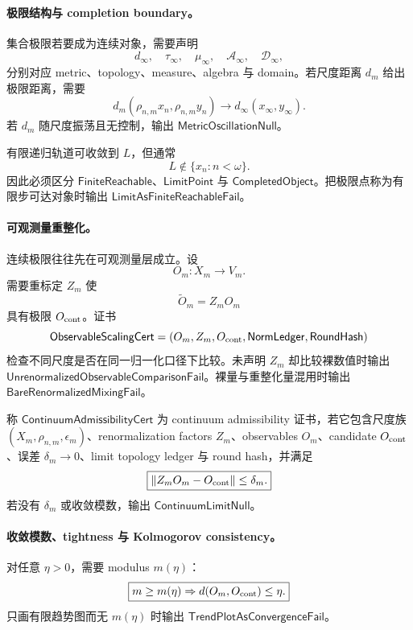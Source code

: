 \paragraph{极限结构与 completion boundary。}
集合极限若要成为连续对象，需要声明
\[
d_\infty,\quad
\tau_\infty,\quad
\mu_\infty,\quad
\mathcal A_\infty,\quad
\mathcal D_\infty,
\]
分别对应 metric、topology、measure、algebra 与 domain。若尺度距离 \(d_m\) 给出极限距离，需要
\[
d_m(\rho_{n,m}x_n,\rho_{n,m}y_n)
\to
d_\infty(x_\infty,y_\infty).
\]
若 \(d_m\) 随尺度振荡且无控制，输出 \(\mathsf{MetricOscillationNull}\)。

有限递归轨道可收敛到 \(L\)，但通常
\[
\boxed{
L\notin\{x_n:n<\omega\}.
}
\]
因此必须区分 \(\mathsf{FiniteReachable}\)、\(\mathsf{LimitPoint}\) 与 \(\mathsf{CompletedObject}\)。把极限点称为有限步可达对象时输出 \(\mathsf{LimitAsFiniteReachableFail}\)。

\paragraph{可观测量重整化。}
连续极限往往先在可观测量层成立。设
\[
O_m:X_m\to V_m.
\]
需要重标定 \(Z_m\) 使
\[
\boxed{
\widetilde O_m=Z_mO_m
}
\]
具有极限 \(O_{\rm cont}\)。证书
\[
\mathsf{ObservableScalingCert}
=(O_m,Z_m,O_{\rm cont},\mathsf{NormLedger},\mathsf{RoundHash})
\]
检查不同尺度是否在同一归一化口径下比较。未声明 \(Z_m\) 却比较裸数值时输出 \(\mathsf{UnrenormalizedObservableComparisonFail}\)。裸量与重整化量混用时输出 \(\mathsf{BareRenormalizedMixingFail}\)。

\begin{definition}\label{def:typed-address-biaxial-completion-continuum-admissibility-cert}
称 \(\mathsf{ContinuumAdmissibilityCert}\) 为 continuum admissibility 证书，若它包含尺度族 \((X_m,\rho_{n,m},\epsilon_m)\)、renormalization factors \(Z_m\)、observables \(O_m\)、candidate \(O_{\rm cont}\)、误差 \(\delta_m\to0\)、limit topology ledger 与 round hash，并满足
\[
\boxed{
\|Z_mO_m-O_{\rm cont}\|\le\delta_m.
}
\]
若没有 \(\delta_m\) 或收敛模数，输出 \(\mathsf{ContinuumLimitNull}\)。
\end{definition}

\paragraph{收敛模数、tightness 与 Kolmogorov consistency。}
对任意 \(\eta>0\)，需要 modulus \(m(\eta)\)：
\[
\boxed{
m\ge m(\eta)
\Rightarrow
d(O_m,O_{\rm cont})\le\eta.
}
\]
只画有限趋势图而无 \(m(\eta)\) 时输出 \(\mathsf{TrendPlotAsConvergenceFail}\)。

